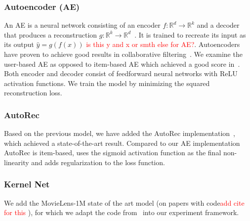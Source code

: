 \documentclass[10pt,conference,compsocconf]{IEEEtran}
\newcommand{\todo}[1]{\textcolor{red}{#1}}
\begin{document}
    \subsubsection{Autoencoder (AE)}
    An AE is a neural network consisting of an encoder $f: \mathbb{R} ^d \rightarrow \mathbb{R} ^k$ and a
    decoder that produces a reconstruction $g: \mathbb{R} ^k \rightarrow \mathbb{R} ^d$~\cite{Goodfellow-et-al-2016}.
    It is trained to recreate its input as its output $\hat{y} = g(f(x))$ \todo{is this y and x or smth else for AE?}.
    Autoencoders have proven to achieve good results in collaborative filtering~\cite{inproceedings}.
    We examine the user-based AE as opposed to item-based AE which achieved a good score in~\cite{inproceedings}.
    Both encoder and decoder consist of feedforward neural networks with ReLU activation functions.
    We train the model by minimizing the squared reconstruction loss.

    \subsubsection{AutoRec}
    Based on the previous model, we have added the AutoRec implementation~\cite{inproceedings}, which achieved a state-of-the-art result.
    Compared to our AE implementation AutoRec is item-based, uses the sigmoid activation function as the final non-linearity and adds regularization to the loss function.

    \subsubsection{Kernel Net}
    We add the MovieLens-1M state of the art model (on papers with code\todo{add cite for this }),
    for which we adapt the code from~\cite{pmlr-v80-muller18a, kernelNetGithub} into our experiment framework.

\end{document}
